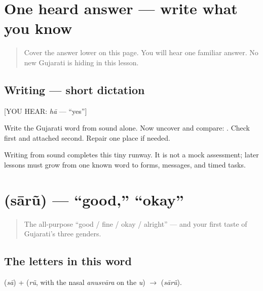 \section[hā]{One heard answer — write what you know}

\label{lesson:GU-W01-haa-dictation}



\begin{quote}
Cover the answer lower on this page. You will hear one familiar answer. No new Gujarati is hiding in this lesson.
\end{quote}

\subsection*{Writing — short dictation}
{[}YOU HEAR: \emph{hā} — \textquotedblleft{}yes\textquotedblright{}{]}

Write the Gujarati word from sound alone. Now uncover and compare: \textbf{}. Check \textbf{} first and attached \textbf{} second. Repair one place if needed.

\begin{tcolorbox}[breakable,colback=teal!4,colframe=teal!35!black,title={Before you move on}]
Writing from sound completes this tiny runway. It is not a mock assessment; later lessons must grow from one known word to forms, messages, and timed tasks.
\end{tcolorbox}
\section[\gu{સારું}]{ (sārũ) — \textquotedblleft{}good,\textquotedblright{} \textquotedblleft{}okay\textquotedblright{}}

\label{lesson:GU-C01-saarun}



\begin{quote}
The all-purpose \textquotedblleft{}good / fine / okay / alright\textquotedblright{} — and your first taste of Gujarati's three genders.
\end{quote}

\subsection*{The letters in this word}
\textbf{} (\emph{sā}) + \textbf{} (\emph{rũ}, with the nasal \emph{anusvāra} on the \emph{u}) $\to$ \textbf{} (\emph{sārũ}).

